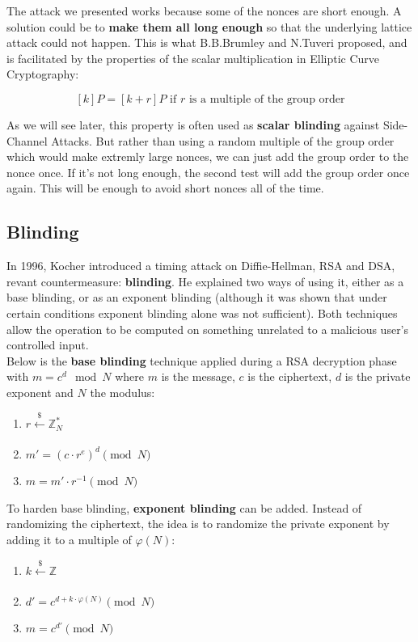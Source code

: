 \documentclass[a4paper,11pt]{article}
\begin{document}
The attack we presented works because some of the nonces are short enough. A solution could be to \textbf{make them all long enough} so that the underlying lattice attack could not happen. This is what B.B.Brumley and N.Tuveri proposed, and is facilitated by the properties of the scalar multiplication in Elliptic Curve Cryptography:

$$ [k]P = [k + r]P \text{ if } r \text{ is a multiple of the group order} $$

As we will see later, this property is often used as \textbf{scalar blinding} against Side-Channel Attacks. But rather than using a random multiple of the group order which would make extremly large nonces, we can just add the group order to the nonce once. If it's not long enough, the second test will add the group order once again. This will be enough to avoid short nonces all of the time.

\subsection{Blinding}

In 1996, Kocher\cite{Kocher} introduced a timing attack on Diffie-Hellman, RSA and DSA, revant countermeasure: \textbf{blinding}. He explained two ways of using it, either as a base blinding, or as an exponent blinding (although it was shown that under certain conditions exponent blinding alone was not sufficient\cite{schindler}). Both techniques allow the operation to be computed on something unrelated to a malicious user's controlled input.\\

Below is the \textbf{base blinding} technique applied during a RSA decryption phase with $m = c^d \mod{N}$ where $m$ is the message, $c$ is the ciphertext, $d$ is the private exponent and $N$ the modulus:

\begin{enumerate}
\item{$r  \xleftarrow[]{\$} \mathbb{Z}_N^{\ast}$}
\item{$m' = (c \cdot r^e)^d \pmod{N}$}
\item{$m = m' \cdot r^{-1} \pmod{N}$}
\end{enumerate}

To harden base blinding, \textbf{exponent blinding} can be added. Instead of randomizing the ciphertext, the idea is to randomize the private exponent by adding it to a multiple of $\varphi(N)$:

\begin{enumerate}
    \item{$k \xleftarrow[]{\$} \mathbb{Z}$}
    \item{$d' = c^{d + k \cdot \varphi(N)} \pmod{N}$}
    \item{$m = c^{d'} \pmod{N}$}
\end{enumerate}
\end{document}

